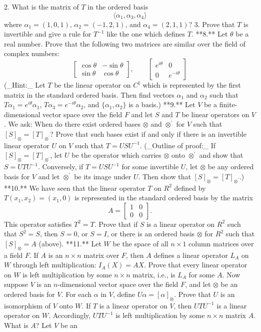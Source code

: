 2. What is the matrix of \(T\) in the ordered basis \[\langle\alpha_{1},\alpha_{3},\alpha_{4}\rangle\] where \(\alpha_{1}=(1,0,1)\), \(\alpha_{2}=(-1,2,1)\), and \(\alpha_{4}=(2,1,1)\)? 3. Prove that \(T\) is invertible and give a rule for \(T^{-1}\) like the one which defines \(T\). **8.** Let \(\theta\) be a real number. Prove that the following two matrices are similar over the field of complex numbers: \[\begin{bmatrix}\cos\theta&-\sin\theta\\ \sin\theta&\cos\theta\end{bmatrix},\qquad\begin{bmatrix}e^{i\theta}&0\\ 0&e^{-i\theta}\end{bmatrix}\] (_Hint:_ Let \(T\) be the linear operator on \(C^{\natural}\) which is represented by the first matrix in the standard ordered basis. Then find vectors \(\alpha_{1}\) and \(\alpha_{2}\) such that \(T\alpha_{1}=e^{i\theta}\alpha_{1}\), \(T\alpha_{3}=e^{-i\theta}\alpha_{2}\), and \(\{\alpha_{1},\alpha_{2}\}\) is a basis.) **9.** Let \(V\) be a finite-dimensional vector space over the field \(F\) and let \(S\) and \(T\) be linear operators on \(V\). We ask: When do there exist ordered bases \(\otimes\) and \(\otimes^{\prime}\) for \(V\) such that \([S]_{\otimes}=[T]_{\otimes^{\prime}}\)? Prove that such bases exist if and only if there is an invertible linear operator \(U\) on \(V\) such that \(T=USU^{-1}\). (_Outline of proof:_ If \([S]_{\otimes}=[T]_{\otimes^{\prime}}\), let \(U\) be the operator which carries \(\otimes\) onto \(\otimes^{\prime}\) and show that \(S=UTU^{-1}\). Conversely, if \(T=USU^{-1}\) for some invertible \(U\), let \(\otimes\) be any ordered basis for \(V\) and let \(\otimes^{\prime}\) be its image under \(U\). Then show that \([S]_{\otimes}=[T]_{\otimes^{\prime}}\).) **10.** We have seen that the linear operator \(T\) on \(R^{2}\) defined by \(T(x_{1},x_{2})=(x_{1},0)\) is represented in the standard ordered basis by the matrix \[A=\begin{bmatrix}1&0\\ 0&0\end{bmatrix}.\] This operator satisfies \(T^{2}=T\). Prove that if \(S\) is a linear operator on \(R^{2}\) such that \(S^{2}=S\), then \(S=0\), or \(S=I\), or there is an ordered basis \(\otimes\) for \(R^{2}\) such that \([S]_{\otimes}=A\) (above). **11.** Let \(W\) be the space of all \(n\times 1\) column matrices over a field \(F\). If \(A\) is an \(n\times n\) matrix over \(F\), then \(A\) defines a linear operator \(L_{A}\) on \(W\) through left multiplication: \(I_{A}(X)=AX\). Prove that every linear operator on \(W\) is left multiplication by some \(n\times n\) matrix, i.e., is \(L_{A}\) for some \(A\). Now suppose \(V\) is an \(n\)-dimensional vector space over the field \(F\), and let \(\otimes\) be an ordered basis for \(V\). For each \(\alpha\) in \(V\), define \(U\alpha=[\alpha]_{\otimes}\). Prove that \(U\) is an isomorphism of \(V\) onto \(W\). If \(T\) is a linear operator on \(V\), then \(UTU^{-1}\) is a linear operator on \(W\). Accordingly, \(UTU^{-1}\) is left multiplication by some \(n\times n\) matrix \(A\). What is \(A\)? Let \(V\) be an 